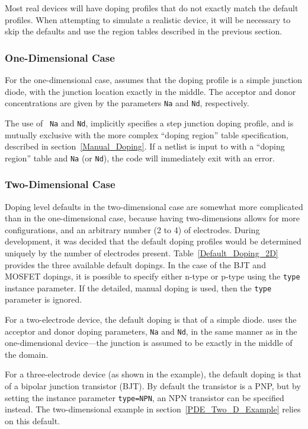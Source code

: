 Most real devices will have doping profiles that do not exactly match the
default profiles.  When attempting to simulate a realistic device, it
will be necessary to skip the defaults and use the region tables described in
the previous section.

\subsubsection{One-Dimensional Case} \label{one_d_default_dope}
For the one-dimensional case, \Xyce{} assumes that the doping profile is a
simple junction diode, with the junction location exactly in the middle.  The
acceptor and donor concentrations are given by the parameters \texttt{Na} and
\texttt{Nd}, respectively.  

The use of ~\texttt{Na} and \texttt{Nd}, implicitly specifies a step junction
doping profile, and is mutually exclusive with the more complex ``doping
region'' table specification, described in section~\ref{Manual_Doping}.  If a
netlist is input to \Xyce{} with a ``doping region'' table and \texttt{Na} (or
\texttt{Nd}), the code will immediately exit with an error.

\subsubsection{Two-Dimensional Case} \label{two_d_default_dope}
Doping level defaults in the two-dimensional case are somewhat more complicated
than in the one-dimensional case, because having two-dimensions allows for more
configurations, and an arbitrary number (2 to 4) of electrodes.  During \Xyce{}
development, it was decided that the default doping profiles would be
determined uniquely by the number of electrodes present.
Table~\ref{Default_Doping_2D} provides the three available default dopings.  In
the case of the BJT and MOSFET dopings, it is possible to specify either n-type
or p-type using the \texttt{type} instance parameter.   If the detailed, manual
doping is used, then the \texttt{type} parameter is ignored.

For a two-electrode device, the default doping is that of a simple diode.
\Xyce{} uses the acceptor and donor doping parameters, \texttt{Na} and
\texttt{Nd}, in the same manner as in the one-dimensional device---the junction
is assumed to be exactly in the middle of the domain.

For a three-electrode device (as shown in the example), the default doping is
that of a bipolar junction transistor (BJT).  By default the transistor is a
PNP, but by setting the instance parameter \texttt{type=NPN}, an NPN transistor
can be specified instead.  The two-dimensional example in
section~\ref{PDE_Two_D_Example} relies on this default.  

